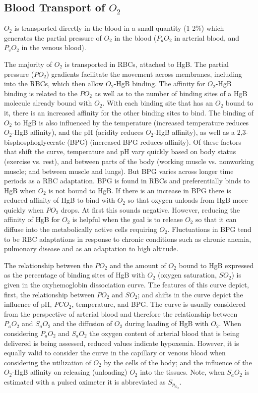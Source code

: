 \subsection{Blood Transport of $O_2$}

$O_2$ is transported directly in the blood in a small quantity (1-2\%) which generates the partial pressure of $O_2$ in the blood ($P_aO_2$ in arterial blood, and $P_vO_2$ in the venous blood). 

The majority of $O_2$ is transported in RBCs, attached to HgB. The partial pressure ($PO_2$) gradients facilitate the movement across membranes, including into the RBCs, which then allow $O_2$-HgB binding. The affinity for $O_2$-HgB binding is related to the $PO_2$ as well as to the number of binding sites of a HgB molecule already bound with $O_2$. With each binding site that has an $O_2$ bound to it, there is an increased affinity for the other binding sites to bind. The binding of $O_2$ to HgB is also influenced by the temperature (increased temperature reduces $O_2$-HgB affinity), and the pH (acidity reduces $O_2$-HgB affinity), as well as a 2,3-bisphosphoglycerate (BPG) (increased BPG reduces affinity). Of these factors that shift the curve, temperature and pH vary quickly based on body status (exercise vs. rest), and between parts of the body (working muscle vs. nonworking muscle; and between muscle and lungs). But BPG varies across longer time periods as a RBC adaptation. 
BPG is found in RBCs and preferentially binds to HgB when $O_2$ is not bound to HgB. If there is an increase in BPG there is reduced affinity of HgB to bind with $O_2$ so that oxygen unloads from HgB more quickly when $PO_2$ drops. At first this sounds negative. However, reducing the affinity of HgB for $O_2$ is helpful when the goal is to release $O_2$ so that it can diffuse into the metabolically active cells requiring $O_2$. Fluctuations in BPG tend to be RBC adaptations in response to chronic conditions such as chronic anemia, pulmonary disease and as an adaptation to high altitude.

The relationship between the $PO_2$ and the amount of $O_2$ bound to HgB expressed as the percentage of binding sites of HgB with $O_2$ (oxygen saturation, $SO_2$) is given in the oxyhemoglobin dissociation curve. The features of this curve depict, first, the relationship between $PO_2$ and $SO_2$; and shifts in the curve depict the influence of pH, $PCO_2$, temperature, and BPG. The curve is usually considered from the perspective of arterial blood and therefore the relationship between $P_aO_2$ and $S_aO_2$ and the diffusion of $O_2$ during loading of HgB with $O_2$. When considering $P_aO_2$ and $S_aO_2$ the oxygen content of arterial blood that is being delivered is being assessed, reduced values indicate hypoxemia. However, it is equally valid to consider the curve in the capillary or venous blood when considering the utilization of $O_2$ by the cells of the body; and the influence of the $O_2$-HgB affinity on releasing (unloading) $O_2$ into the tissues.
Note, when $S_aO_2$ is estimated with a pulsed oximeter it is abbreviated as $S_p_O_2$.

